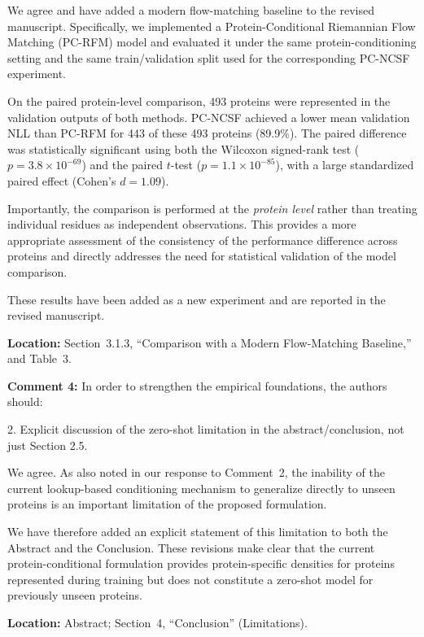 \documentclass[a4paper,11pt]{article}
\newcommand{\reviewercomment}[2]{%
    \begin{reviewerscomment}
        \textbf{Comment #1:} #2
    \end{reviewerscomment}
}
\newcommand{\response}[1]{%
    \begin{myresponse}
        #1
    \end{myresponse}
    \vspace{5mm}
}
\begin{document}
\response{
We agree and have added a modern flow-matching baseline to the revised
manuscript. Specifically, we implemented a Protein-Conditional Riemannian Flow
Matching (PC-RFM) model and evaluated it under the same protein-conditioning
setting and the same train/validation split used for the corresponding
PC-NCSF experiment.

On the paired protein-level comparison, 493 proteins were represented in the
validation outputs of both methods. PC-NCSF achieved a lower mean validation
NLL than PC-RFM for 443 of these 493 proteins (89.9\%). The paired difference
was statistically significant using both the Wilcoxon signed-rank test
($p=3.8\times10^{-69}$) and the paired $t$-test
($p=1.1\times10^{-85}$), with a large standardized paired effect
(Cohen's $d=1.09$).

Importantly, the comparison is performed at the \emph{protein level} rather
than treating individual residues as independent observations. This provides
a more appropriate assessment of the consistency of the performance
difference across proteins and directly addresses the need for statistical
validation of the model comparison.

These results have been added as a new experiment and are reported in the
revised manuscript.

\textbf{Location:} Section~3.1.3, ``Comparison with a Modern Flow-Matching
Baseline,'' and Table~3.
}



\reviewercomment{4}{
In order to strengthen the empirical foundations, the authors should:

2. Explicit discussion of the zero-shot limitation in the
abstract/conclusion, not just Section 2.5.
}

\response{
We agree. As also noted in our response to Comment~2, the inability of the
current lookup-based conditioning mechanism to generalize directly to unseen
proteins is an important limitation of the proposed formulation.

We have therefore added an explicit statement of this limitation to both the
Abstract and the Conclusion. These revisions make clear that the current
protein-conditional formulation provides protein-specific densities for
proteins represented during training but does not constitute a zero-shot model
for previously unseen proteins.

\textbf{Location:} Abstract; Section~4, ``Conclusion'' (Limitations).
}
\end{document}
